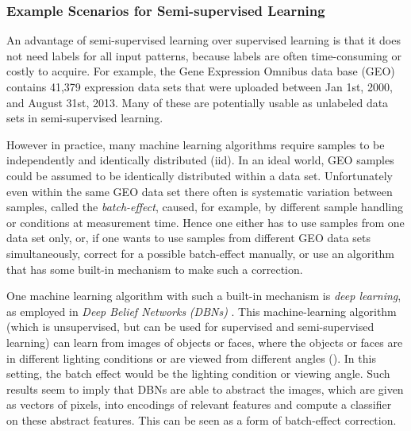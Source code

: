 \subsubsection{Example Scenarios for Semi-supervised Learning}

An advantage of semi-supervised learning over supervised learning
is that it does not need labels for all input patterns, because labels
are often time-consuming or costly to acquire. For example, the Gene
Expression Omnibus data base (GEO) \cite{BarrettSoboleva2013} contains
41,379 expression data sets that were uploaded between Jan 1st, 2000,
and August 31st, 2013. Many of these are potentially usable as unlabeled
data sets in semi-supervised learning.

However in practice, many machine learning algorithms require samples
to be independently and identically distributed
(iid). In an ideal world, GEO samples could be assumed
to be identically distributed within a data set. Unfortunately even
within the same GEO data set there often is systematic variation between
samples, called the \emph{batch-effect}, caused,
for example, by different sample handling or conditions at measurement
time. Hence one either has to use samples from one data set only,
or, if one wants to use samples from different GEO data sets simultaneously,
correct for a possible batch-effect manually, or use an algorithm
that has some built-in mechanism to make such a correction.

One machine learning algorithm with such a built-in mechanism is\emph{
deep learning}, as employed in \emph{Deep Belief
Networks}\emph{ (DBNs}\emph{)}
\cite{HintonTeh2006}. This machine-learning algorithm (which is unsupervised,
but can be used for supervised and semi-supervised learning) can learn
from images of objects or faces, where the objects or faces are in
different lighting conditions or are viewed from different angles
(\cite{HintonSalakhutdinov2006,KrizhevskyHinton2012,KarpathyFei-Fei2014}).
In this setting, the batch effect would be the lighting condition
or viewing angle. Such results seem to imply that DBNs are able to
abstract the images, which are given as vectors of pixels, into encodings
of relevant features and compute a classifier on these abstract features.
This can be seen as a form of batch-effect correction.

